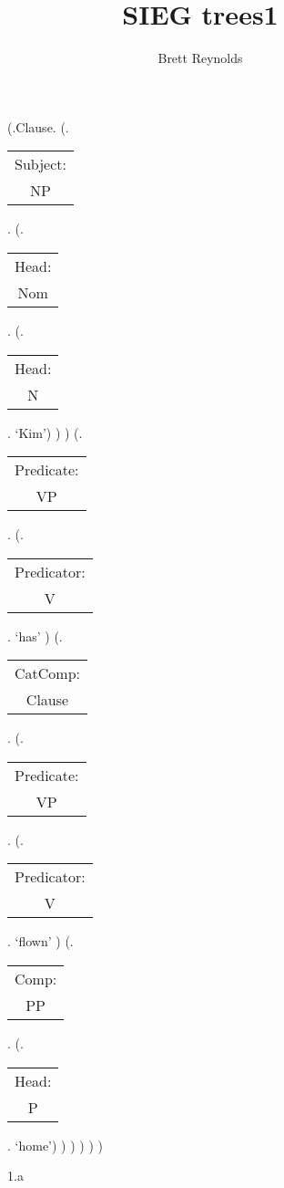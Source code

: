 \documentclass[12pt,letterpaper]{article}
\author{Brett Reynolds}
\title{SIEG trees1}
\begin{document}
		\begin{figure}
			\begin{center}
				\begin{parsetree}
					(.Clause.
						(.\begin{tabular}{c}Subject:\\NP\end{tabular}.  
							(.\begin{tabular}{c}Head:\\Nom\end{tabular}.
								(.\begin{tabular}{c}Head:\\N\end{tabular}. `Kim')
							)
						)
						(.\begin{tabular}{c}Predicate:\\VP\end{tabular}.
							(.\begin{tabular}{c}Predicator:\\V\end{tabular}.    `has' )
								(.\begin{tabular}{c}CatComp:\\Clause\end{tabular}. 
									(.\begin{tabular}{c}Predicate:\\VP\end{tabular}.
										(.\begin{tabular}{c}Predicator:\\V\end{tabular}.    `flown' )
										(.\begin{tabular}{c}Comp:\\PP\end{tabular}. 
											(.\begin{tabular}{c}Head:\\P\end{tabular}. `home')
										)
									)
								)
							)
					) 
				
				\end{parsetree}
				\hfill \break \hfill \break
				1.a
			\end{center}
		\end{figure}
\end{document}
